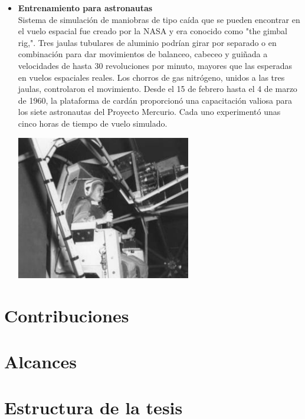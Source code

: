 \begin{itemize}
    \item \textbf{Entrenamiento para astronautas}\\
    Sistema de simulación de maniobras de tipo caída que se pueden encontrar en el vuelo espacial
    fue creado por la NASA y era conocido como "the gimbal rig,".
    Tres jaulas tubulares de aluminio podrían girar por separado o en combinación para 
    dar movimientos de balanceo, cabeceo y guiñada a velocidades de hasta 30 
    revoluciones por minuto, mayores que las esperadas en vuelos espaciales reales. 
    Los chorros de gas nitrógeno, unidos a las tres jaulas, controlaron el movimiento.
    Desde el 15 de febrero hasta el 4 de marzo de 1960, la plataforma de cardán 
    proporcionó una capacitación valiosa para los siete astronautas del Proyecto 
    Mercurio. Cada uno experimentó unas cinco horas de tiempo de vuelo simulado.
    ~\cite{MERCURY}
    \begin{center}
        \includegraphics[width=0.6\textwidth]{Capitulo1/Fig3.eps}       
        \label{Fig3}
    \end{center}

\end{itemize}

\section{Contribuciones}

\section{Alcances}


\section{Estructura de la tesis}